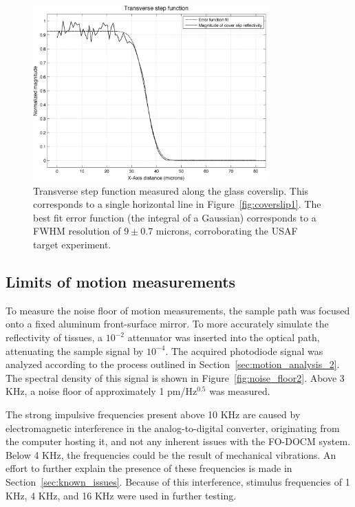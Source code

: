 \begin{figure}[h!]
\centering
\includegraphics[width=0.8\textwidth]{Images/Results/line_step.png}
\caption[Transverse step function measured along the glass coverslip.]{Transverse step function measured along the glass coverslip. This corresponds to a single horizontal line in Figure~\ref{fig:coverslip1}. The best fit error function (the integral of a Gaussian) corresponds to a FWHM resolution of $9 \pm 0.7$ microns, corroborating the USAF target experiment.\label{fig:coverslip2}}
\end{figure}

\subsection{Limits of motion measurements}

To measure the noise floor of motion measurements, the sample path was focused onto a fixed aluminum front-surface mirror. 
To more accurately simulate the reflectivity of tissues, a $10^{-2}$ attenuator was inserted into the optical path, attenuating the sample signal by $10^{-4}$. The acquired photodiode signal was analyzed according to the process outlined in Section~\ref{sec:motion_analysis_2}. The spectral density of this signal is shown in Figure~\ref{fig:noise_floor2}.
Above 3 KHz, a noise floor of approximately 1 pm/Hz$^{0.5}$ was measured.

The strong impulsive frequencies present above 10 KHz are caused by electromagnetic interference in the analog-to-digital converter, originating from the computer hosting it, and not any inherent issues with the FO-DOCM system. Below 4 KHz, the frequencies could be the result of mechanical vibrations. An effort to further explain the presence of these frequencies is made in Section~\ref{sec:known_issues}. Because of this interference, stimulus frequencies of 1 KHz, 4 KHz, and 16 KHz were used in further testing. %

